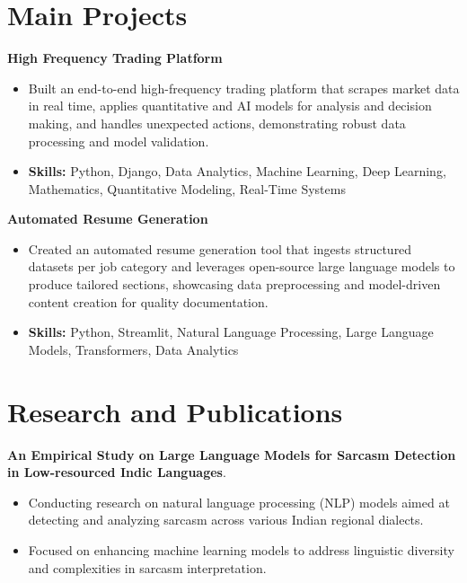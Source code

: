 \documentclass[a4paper,11pt]{article}
\begin{document}
\section{\textbf{Main Projects}}

\vspace{1mm}
  \textbf{High Frequency Trading Platform  }
\vspace{-1.5mm} %
\begin{itemize}
  \item Built an end-to-end high-frequency trading platform that scrapes market data in real time, applies quantitative and AI models for analysis and decision making, and handles unexpected actions, demonstrating robust data processing and model validation.
\vspace{-3mm}
  \item \textbf{Skills:} Python, Django, Data Analytics, Machine Learning, Deep Learning, Mathematics, Quantitative Modeling, Real-Time Systems
\end{itemize}


\vspace{1mm}
   \textbf{Automated Resume Generation }
\vspace{-1.5mm} %
\begin{itemize}
  \item Created an automated resume generation tool that ingests structured datasets per job category and leverages open-source large language models to produce tailored sections, showcasing data preprocessing and model-driven content creation for quality documentation.
\vspace{-3mm}
  \item \textbf{Skills:} Python, Streamlit, Natural Language Processing, Large Language Models, Transformers, Data Analytics
\end{itemize}



\section{\textbf{Research and Publications} \hfill }
\vspace{1mm}
  \textbf{An Empirical Study on Large Language Models for Sarcasm Detection in Low-resourced Indic Languages}.
\vspace{-1mm} %
\begin{itemize}
  \item Conducting research on natural language processing (NLP) models aimed at detecting and analyzing sarcasm across various Indian regional dialects.
\vspace{-3mm}
  \item Focused on enhancing machine learning models to address linguistic diversity and complexities in sarcasm interpretation.
\end{itemize}
\end{document}

